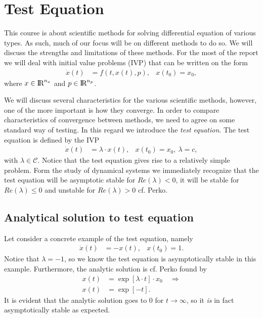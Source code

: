 \chapter{Test Equation}
This course is about scientific methods for solving differential equation of various types. As such, much of our focus will be on different methods to do so. We will discuss the strengths and limitations of these methods. For the most of the report we will deal with initial value problems (IVP) that can be written on the form
\begin{align}
    \dot{x}(t) &= f(t,x(t),p), & x(t_0) = x_0,
\end{align}
where $x \in \text{I\kern-0.15em R} ^{n_x}$ and $p \in \text{I\kern-0.15em R} ^{n_p}$. 

We will discuss several characteristics for the various scientific methods, however, one of the more important is how they converge. In order to compare characteristics of convergence between methods, we need to agree on some standard way of testing. In this regard we introduce the \textit{test equation}. The test equation is defined by the IVP 
\begin{align}
    \dot{x}(t) &= \lambda \cdot x(t), & x(t_0)=x_0, \ \lambda=c,
\end{align}
with $\lambda \in \mathcal{C}$.
Notice that the test equation gives rise to a relatively simple problem. Form the study of dynamical systems we immediately recognize that the test equation will be asymptotic stable for $Re(\lambda)<0$, it will be stable for $Re(\lambda) \leq 0$ and unstable for $Re(\lambda)>0$ cf. Perko\cite{Perko}. 

\section{Analytical solution to test equation}
Let consider a concrete example of the test equation, namely 
\begin{align}
    \dot{x}(t) &= -x(t), & x(t_0)=1. \label{eq:ivp1}
\end{align}
Notice that $\lambda=-1$, so we know the test equation is asymptotically stable in this example. Furthermore, the analytic solution is cf. Perko\cite{Perko} found by
\begin{align}
    x(t) &= \exp \left [ \lambda \cdot t  \right ] \cdot x_0 \quad \Rightarrow \\
    x(t) &=  \exp \left [ - t  \right ].
\end{align}
It is evident that the analytic solution goes to $0$ for $t \rightarrow \infty$, so it \textit{is} in fact asymptotically stable as expected. 


